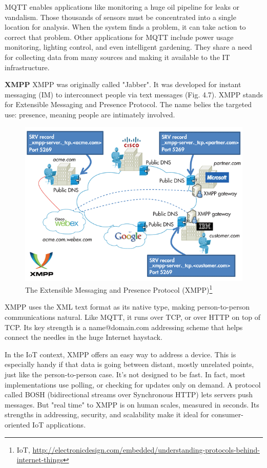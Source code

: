       MQTT enables applications like monitoring a huge oil pipeline for leaks or vandalism. Those thousands of sensors must be concentrated into a single location for analysis. When the system finds a problem, it can take action to correct that problem. Other applications for MQTT include power usage monitoring, lighting control, and even intelligent gardening. They share a need for collecting data from many sources and making it available to the IT infrastructure.

     \textbf{XMPP}
      \newline 
      XMPP was originally called "Jabber". It was developed for instant messaging (IM) to interconnect people via text messages (Fig. 4.7). XMPP stands for Extensible Messaging and Presence Protocol. The name belies the targeted use: presence, meaning people are intimately involved.
      \begin{figure}[!ht]
      \centering
      \includegraphics[scale=0.7]{images/XMPP.png}   
      \caption[The Extensible Messaging and Presence Protocol (XMPP)]{The Extensible Messaging and Presence Protocol (XMPP)\footnote{IoT, \url{http://electronicdesign.com/embedded/understanding-protocols-behind-internet-things}}}
      \label{img:XMPP}                           
      \end{figure}
      XMPP uses the XML text format as its native type, making person-to-person communications natural. Like MQTT, it runs over TCP, or over HTTP on top of TCP. Its key strength is a name@domain.com addressing scheme that helps connect the needles in the huge Internet haystack.

      In the IoT context, XMPP offers an easy way to address a device. This is especially handy if that data is going between distant, mostly unrelated points, just like the person-to-person case. It’s not designed to be fast. In fact, most implementations use polling, or checking for updates only on demand. A protocol called BOSH (bidirectional streams over Synchronous HTTP) lets servers push messages. But "real time" to XMPP is on human scales, measured in seconds. Its strengths in addressing, security, and scalability make it ideal for consumer-oriented IoT applications.

